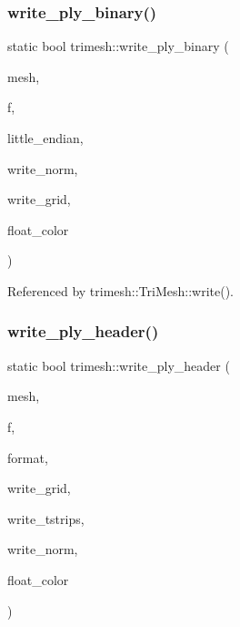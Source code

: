 \subsubsection{\texorpdfstring{write\+\_\+ply\+\_\+binary()}{write\_ply\_binary()}}
{\footnotesize\ttfamily static bool trimesh\+::write\+\_\+ply\+\_\+binary (\begin{DoxyParamCaption}\item[{\hyperlink{classtrimesh_1_1TriMesh}{Tri\+Mesh} $\ast$}]{mesh,  }\item[{F\+I\+LE $\ast$}]{f,  }\item[{bool}]{little\+\_\+endian,  }\item[{bool}]{write\+\_\+norm,  }\item[{bool}]{write\+\_\+grid,  }\item[{bool}]{float\+\_\+color }\end{DoxyParamCaption})\hspace{0.3cm}{\ttfamily [static]}}



Referenced by trimesh\+::\+Tri\+Mesh\+::write().

\mbox{\label{namespacetrimesh_a40f3489c91c9410ab262e406cb3256d2}} 
\subsubsection{\texorpdfstring{write\+\_\+ply\+\_\+header()}{write\_ply\_header()}}
{\footnotesize\ttfamily static bool trimesh\+::write\+\_\+ply\+\_\+header (\begin{DoxyParamCaption}\item[{\hyperlink{classtrimesh_1_1TriMesh}{Tri\+Mesh} $\ast$}]{mesh,  }\item[{F\+I\+LE $\ast$}]{f,  }\item[{const char $\ast$}]{format,  }\item[{bool}]{write\+\_\+grid,  }\item[{bool}]{write\+\_\+tstrips,  }\item[{bool}]{write\+\_\+norm,  }\item[{bool}]{float\+\_\+color }\end{DoxyParamCaption})\hspace{0.3cm}{\ttfamily [static]}}



